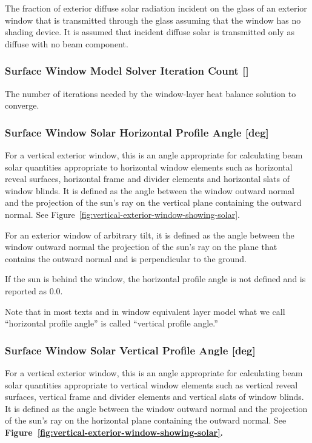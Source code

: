 The fraction of exterior diffuse solar radiation incident on the glass of an exterior window that is transmitted through the glass assuming that the window has no shading device. It is assumed that incident diffuse solar is transmitted only as diffuse with no beam component.

\subsubsection{Surface Window Model Solver Iteration Count {[]}}\label{surface-window-model-solver-iteration-count}

The number of iterations needed by the window-layer heat balance solution to converge.

\subsubsection{Surface Window Solar Horizontal Profile Angle {[}deg{]}}\label{surface-window-solar-horizontal-profile-angle-deg}

For a vertical exterior window, this is an angle appropriate for calculating beam solar quantities appropriate to horizontal window elements such as horizontal reveal surfaces, horizontal frame and divider elements and horizontal slats of window blinds. It is defined as the angle between the window outward normal and the projection of the sun's ray on the vertical plane containing the outward normal. See Figure~\ref{fig:vertical-exterior-window-showing-solar}.

For an exterior window of arbitrary tilt, it is defined as the angle between the window outward normal the projection of the sun's ray on the plane that contains the outward normal and is perpendicular to the ground.

If the sun is behind the window, the horizontal profile angle is not defined and is reported as 0.0.

Note that in most texts and in window equivalent layer model what we call ``horizontal profile angle'' is called ``vertical profile angle.''

\subsubsection{Surface Window Solar Vertical Profile Angle {[}deg{]}}\label{surface-window-solar-vertical-profile-angle-deg}

For a vertical exterior window, this is an angle appropriate for calculating beam solar quantities appropriate to vertical window elements such as vertical reveal surfaces, vertical frame and divider elements and vertical slats of window blinds. It is defined as the angle between the window outward normal and the projection of the sun's ray on the horizontal plane containing the outward normal. See \textbf{Figure~\ref{fig:vertical-exterior-window-showing-solar}.}

